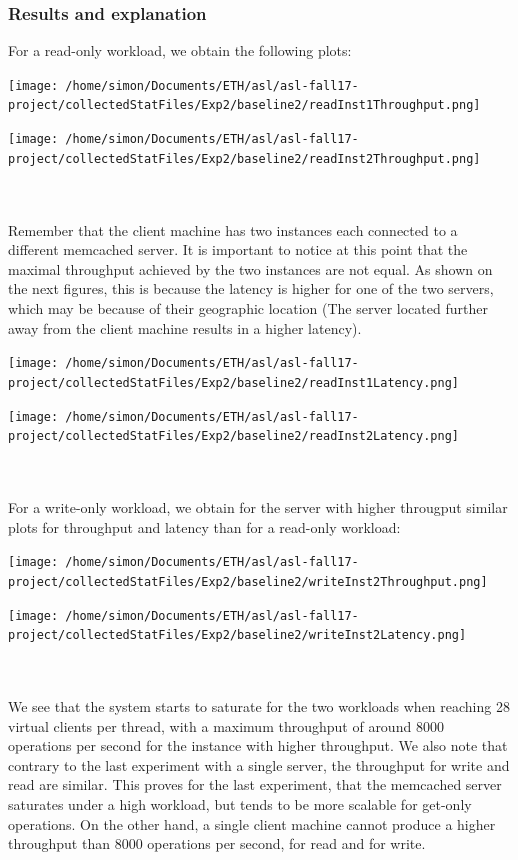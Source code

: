 \documentclass[11pt,a4paper]{article}
\begin{document}
\subsubsection{Results and explanation}
For a read-only workload, we obtain the following plots:
\\
\begin{minipage}{0.5\linewidth}
\texttt{[image: /home/simon/Documents/ETH/asl/asl-fall17-project/collectedStatFiles/Exp2/baseline2/readInst1Throughput.png]}
\end{minipage}
\hfill
\begin{minipage}{0.5\linewidth}
\texttt{[image: /home/simon/Documents/ETH/asl/asl-fall17-project/collectedStatFiles/Exp2/baseline2/readInst2Throughput.png]}
\end{minipage}
\\\\
Remember that the client machine has two instances each connected to a different memcached server. It is important to notice at this point that the maximal throughput achieved by the two instances are not equal. As shown on the next figures, this is because the latency is higher for one of the two servers, which may be because of their geographic location (The server located further away from the client machine results in a higher latency).
\begin{minipage}{0.5\linewidth}
\texttt{[image: /home/simon/Documents/ETH/asl/asl-fall17-project/collectedStatFiles/Exp2/baseline2/readInst1Latency.png]}
\end{minipage}
\hfill
\begin{minipage}{0.5\linewidth}
\texttt{[image: /home/simon/Documents/ETH/asl/asl-fall17-project/collectedStatFiles/Exp2/baseline2/readInst2Latency.png]}
\end{minipage}
\\\\
For a write-only workload, we obtain for the server with higher througput similar plots for throughput and latency than for a read-only workload:
\\
\begin{minipage}{0.5\linewidth}
\texttt{[image: /home/simon/Documents/ETH/asl/asl-fall17-project/collectedStatFiles/Exp2/baseline2/writeInst2Throughput.png]}
\end{minipage}
\hfill
\begin{minipage}{0.5\linewidth}
\texttt{[image: /home/simon/Documents/ETH/asl/asl-fall17-project/collectedStatFiles/Exp2/baseline2/writeInst2Latency.png]}
\end{minipage}
\\
\\
We see that the system starts to saturate for the two workloads when reaching 28 virtual clients per thread, with a maximum throughput of around 8000 operations per second for the instance with higher throughput.  
We also note that contrary to the last experiment with a single server, the throughput for write and read are similar. This proves for the last experiment, that the memcached server saturates under a high workload, but tends to be more scalable for get-only operations. On the other hand, a single client machine cannot produce a higher throughput than 8000 operations per second, for read and for write.   
\end{document}
